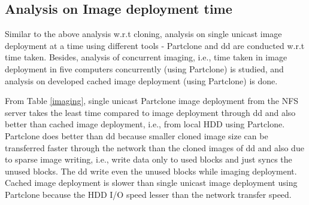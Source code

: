 \documentclass[a4paper,12pt]{article}
\begin{document}
\subsection{ Analysis on Image deployment time }
Similar to the above analysis w.r.t cloning, analysis on single unicast image deployment at a time using different tools - Partclone and dd are conducted w.r.t time taken. Besides, analysis of concurrent imaging, i.e., time taken in image deployment in five computers concurrently (using Partclone) is studied, and analysis on developed cached image deployment (using Partclone) is done.

From Table \ref{imaging}, single unicast Partclone image deployment from the NFS server takes the least time compared to image deployment through dd and also better than cached image deployment, i.e., from local HDD using Partclone. Partclone does better than dd because smaller cloned image size can be transferred faster through the network than the cloned images of dd and also due to sparse image writing, i.e., write data only to used blocks and just syncs the unused blocks. The dd write even the unused blocks while imaging deployment. Cached image deployment is slower than single unicast image deployment using Partclone because the HDD I/O speed lesser than the network transfer speed. 
\end{document}
